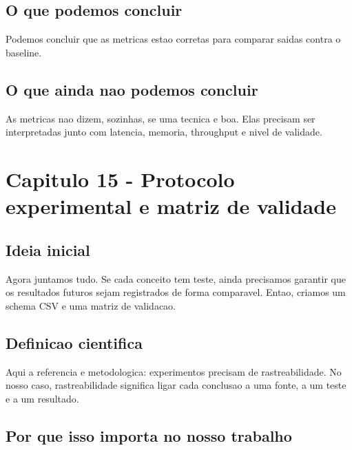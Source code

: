 \subsection{O que podemos concluir}




Podemos concluir que as metricas estao corretas para comparar saidas contra o baseline.



\subsection{O que ainda nao podemos concluir}




As metricas nao dizem, sozinhas, se uma tecnica e boa. Elas precisam ser interpretadas junto com latencia, memoria, throughput e nivel de validade.



\section{Capitulo 15 - Protocolo experimental e matriz de validade}



\subsection{Ideia inicial}





Agora juntamos tudo. Se cada conceito tem teste, ainda precisamos garantir que os resultados futuros sejam registrados de forma comparavel. Entao, criamos um schema CSV e uma matriz de validacao.



\subsection{Definicao cientifica}





Aqui a referencia e metodologica: experimentos precisam de rastreabilidade. No nosso caso, rastreabilidade significa ligar cada conclusao a uma fonte, a um teste e a um resultado.



\subsection{Por que isso importa no nosso trabalho}




